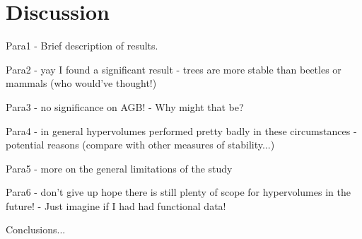 
\section{Discussion}

Para1 - Brief description of results.

Para2 - yay I found a significant result - trees are more stable than beetles or mammals (who would've thought!)

Para3 - no significance on AGB! - Why might that be?

Para4 - in general hypervolumes performed pretty badly in these circumstances - potential reasons (compare with other measures of stability...)

Para5 - more on the general limitations of the study

Para6 - don't give up hope there is still plenty of scope for hypervolumes in the future! - Just imagine if I had had functional data!


Conclusions...